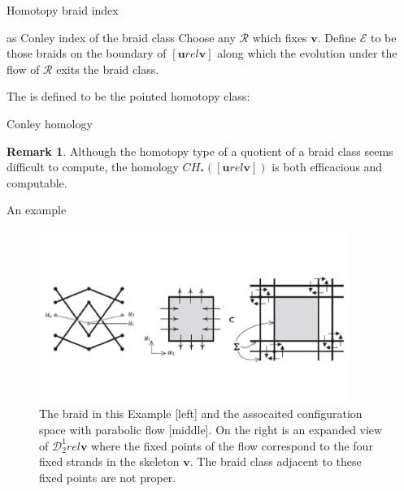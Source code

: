 \documentclass[9pt, english]{beamer}
\theoremstyle{definition}
\newtheorem{oss}[thm]{Remark}
\newcommand{\simbolovettore}[1]{{\boldsymbol{#1}}}
\newcommand{\vh}{\simbolovettore{h}}
\newcommand{\vu}{\simbolovettore{u}}
\newcommand{\vv}{\simbolovettore{v}}
\begin{document}
\begin{frame}{Homotopy braid index}
    \begin{block}{as Conley index of the braid class}\pause
        Choose any $\mathscr R$ which fixes $\vv$. Define $\mathscr E$
        to be those braids on the boundary of $[\vu rel \vv]$ along
        which the evolution under the flow of $\mathscr R$ exits the
        braid class.\pause

        The {\color{red}{homotopy braid index}\/} is defined to be the pointed homotopy
        class:\pause
        {\color{blue}{
        \[
        \vh([\vu rel\vv]):=([\vu rel \vv]/\mathscr E, \{\mathscr E\}).
        \]}\/}
    \end{block}
\end{frame}
\begin{frame}{Conley homology}
    \begin{oss}
    Although the homotopy type of a quotient of a braid class seems
    difficult to compute, the homology $CH_*([\vu rel \vv])$ is both
    \alert{efficacious} and \alert{computable}.
    \end{oss}
\end{frame}
\begin{frame}{An example}
\begin{figure}\label{fig:example}
        \includegraphics[width=0.9\textwidth]{images/Fig5Inventiones2.pdf}\caption{The braid in this Example [left]
        and the assocaited configuration space with parabolic flow [middle]. On the right is an expanded view
         of $\mathscr D_2^1 rel \vv$ where the fixed points of the flow correspond to the four fixed strands in the
         skeleton $\vv$. The braid class adjacent to these fixed points are not proper.}
        \end{figure}
\end{frame}
\end{document}
